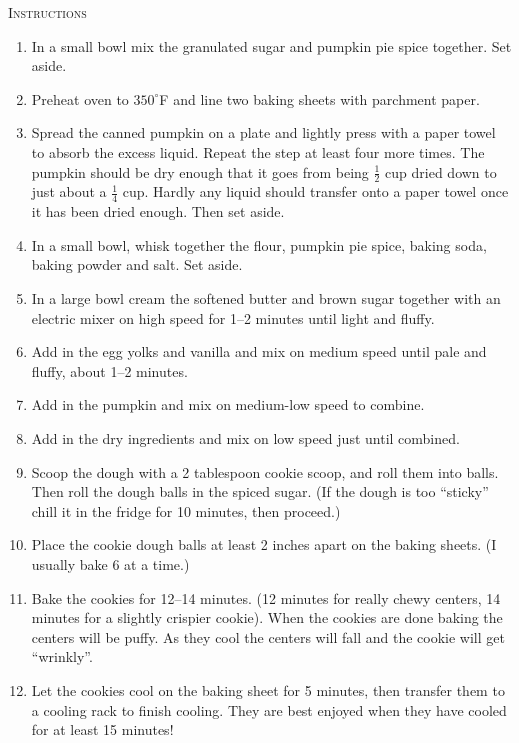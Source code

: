 \documentclass[12pt]{article}
\newenvironment{instructions}
{
    \begin{minipage}[t]{0.7\textwidth}
    {\large\textsc{Instructions}}
    \small
    \begin{enumerate}[leftmargin=*]
}
{
    \end{enumerate}
    \end{minipage}
}
\newcommand{\temp}[2]
{
    $#1^{\circ}$#2
}
\begin{document}
\begin{instructions}
    \item In a small bowl mix the granulated sugar and pumpkin pie spice together. Set aside.
    \item Preheat oven to \temp{350}{F} and line two baking sheets with parchment paper.
    \item Spread the canned pumpkin on a plate and lightly press with a paper towel to absorb the excess liquid. Repeat the step at least four more times. The pumpkin should be dry enough that it goes from being $\frac{1}{2}$ cup dried down to just about a $\frac{1}{4}$ cup. Hardly any liquid should transfer onto a paper towel once it has been dried enough. Then set aside.
    \item In a small bowl, whisk together the flour, pumpkin pie spice, baking soda, baking powder and salt. Set aside.
    \item In a large bowl cream the softened butter and brown sugar together with an electric mixer on high speed for 1--2 minutes until light and fluffy.
    \item Add in the egg yolks and vanilla and mix on medium speed until pale and fluffy, about 1--2 minutes.
    \item Add in the pumpkin and mix on medium-low speed to combine.
    \item Add in the dry ingredients and mix on low speed just until combined.
    \item Scoop the dough with a 2 tablespoon cookie scoop, and roll them into balls. Then roll the dough balls in the spiced sugar. (If the dough is too ``sticky'' chill it in the fridge for 10 minutes, then proceed.)
    \item Place the cookie dough balls at least 2 inches apart on the baking sheets. (I usually bake 6 at a time.)
    \item Bake the cookies for 12--14 minutes. (12 minutes for really chewy centers, 14 minutes for a slightly crispier cookie). When the cookies are done baking the centers will be puffy. As they cool the centers will fall and the cookie will get ``wrinkly''.
    \item Let the cookies cool on the baking sheet for 5 minutes, then transfer them to a cooling rack to finish cooling. They are best enjoyed when they have cooled for at least 15 minutes!\footnotemark[2]
\end{instructions}
\newpage
\end{document}
